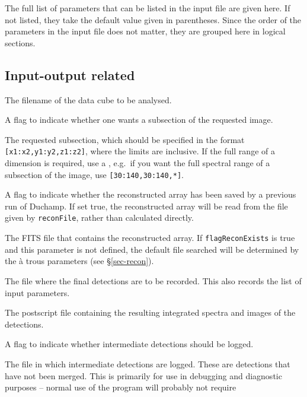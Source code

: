 \documentclass[12pt,a4paper]{article}
\newcommand{\eg}{e.g.\ }
\newcommand{\entrylabel}[1]{\mbox{\textsf{\bf{#1:}}}\hfil}
\newenvironment{entry}
        {\begin{list}{}%
                {\renewcommand{\makelabel}{\entrylabel}%
                        \setlength{\labelwidth}{30mm}%
                        \setlength{\labelsep}{5pt}%
                        \setlength{\itemsep}{2pt}%
                        \setlength{\parsep}{2pt}%
                        \setlength{\leftmargin}{35mm}%
                }%
        }%
{\end{list}}
\begin{document}
The full list of parameters that can be listed in the input file are
given here. If not listed, they take the default value given in
parentheses. Since the order of the parameters in the input file does
not matter, they are grouped here in logical sections.

\subsection*{Input-output related}
\begin{entry}
\item[ImageFile (no default assumed)] The filename of the
  data cube to be analysed.
\item[flagSubsection {\tt [false]}] A flag to indicate whether one
  wants a subsection of the requested image.
\item[Subsection {\tt [ [*,*,*] ]}] The requested subsection, which
  should be specified in the format {\tt [x1:x2,y1:y2,z1:z2]}, where
  the limits are inclusive. If the full range of a dimension is
  required, use a {\tt *}, \eg if you want the full spectral range of
  a subsection of the image, use {\tt [30:140,30:140,*]}.
\item[flagReconExists {\tt [false]}] A flag to indicate whether the
  reconstructed array has been saved by a previous run of Duchamp. If
  set true, the reconstructed array will be read from the file given by
  {\tt reconFile}, rather than calculated directly.
\item[reconFile (no default assumed)] The FITS file that contains the
  reconstructed array. If {\tt flagReconExists} is true and this
  parameter is not defined, the default file searched will be
  determined by the {\`a} trous parameters (see \S\ref{sec-recon}).
\item[OutFile {\tt [./duchamp-Results]}] The file where the final
  detections are to be recorded. This also records the list of input
  parameters.
\item[SpectraFile {\tt [./duchamp-Spectra.ps]}] The postscript file
  containing the resulting integrated spectra and images of the
  detections. 
\item[flagLog {\tt [true]}] A flag to indicate whether intermediate
  detections should be logged.
\item[LogFile {\tt [./duchamp-Logfile]}] The file in which intermediate
  detections are logged. These are detections that have not been
  merged. This is primarily for use in debugging and diagnostic
  purposes -- normal use of the program will probably not require

\end{entry}
\end{document}
